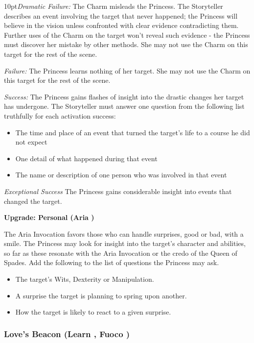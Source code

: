 \begin{myindentpar}{10pt}\emph{Dramatic Failure:} The Charm misleads the Princess. The Storyteller describes an event involving the target that never happened; the Princess will believe in the vision unless confronted with clear evidence contradicting them. Further uses of the Charm on the target won't reveal such evidence - the Princess must discover her mistake by other methods. She may not use the Charm on this target for the rest of the scene.

\emph{Failure:} The Princess learns nothing of her target. She may not use the Charm on this target for the rest of the scene.

\emph{Success:} The Princess gains flashes of insight into the drastic changes her target has undergone. The Storyteller must answer one question from the following list truthfully for each activation success:

\begin{itemize}
\item The time and place of an event that turned the target's life to a course he did not expect
\item One detail of what happened during that event
\item The name or description of one person who was involved in that event
\end{itemize}

\emph{Exceptional Success} The Princess gains considerable insight into events that changed the target.

\textbf{Upgrade: Personal (Aria \textbullet\textbullet)}

The Aria Invocation favors those who can handle surprises, good or bad, with a smile. The Princess may look for insight into the target's character and abilities, so far as these resonate with the Aria Invocation or the credo of the Queen of Spades. Add the following to the list of questions the Princess may ask.
\begin{itemize}
 \item The target's Wits, Dexterity or Manipulation.
 \item A surprise the target is planning to spring upon another. 
 \item How the target is likely to react to a given surprise.
\end{itemize}\end{myindentpar}

\subsubsection*{Love's Beacon (Learn \textbullet\textbullet, Fuoco \textbullet)}

